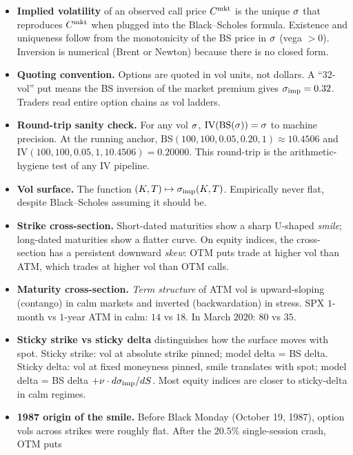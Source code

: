 \begin{itemize}
  \item \textbf{Implied volatility} of an observed call price
  $C^{\text{mkt}}$ is the unique $\sigma$ that reproduces
  $C^{\text{mkt}}$ when plugged into the Black--Scholes
  formula. Existence and uniqueness follow from the monotonicity
  of the BS price in $\sigma$ (vega $> 0$). Inversion is numerical
  (Brent or Newton) because there is no closed form.
  \item \textbf{Quoting convention.} Options are quoted in vol
  units, not dollars. A ``$32$-vol'' put means the BS
  inversion of the market premium gives $\sigma_{\text{imp}} =
  0.32$. Traders read entire option chains as vol ladders.
  \item \textbf{Round-trip sanity check.} For any vol $\sigma$,
  $\text{IV}(\text{BS}(\sigma)) = \sigma$ to machine precision.
  At the running anchor, $\text{BS}(100, 100, 0.05, 0.20, 1)
  \approx 10.4506$ and $\text{IV}(100, 100, 0.05, 1, 10.4506) =
  0.20000$. This round-trip is the arithmetic-hygiene test of any
  IV pipeline.
  \item \textbf{Vol surface.} The function $(K, T)
  \mapsto \sigma_{\text{imp}}(K, T)$. Empirically
  never flat, despite Black--Scholes assuming it should be.
  \item \textbf{Strike cross-section.} Short-dated maturities
  show a sharp U-shaped \emph{smile}; long-dated maturities show
  a flatter curve. On equity indices, the cross-section has a
  persistent downward \emph{skew}: OTM puts trade at higher vol
  than ATM, which trades at higher vol than OTM calls.
  \item \textbf{Maturity cross-section.} \emph{Term structure} of
  ATM vol is upward-sloping (contango) in calm markets and
  inverted (backwardation) in stress. SPX $1$-month vs $1$-year
  ATM in calm: $14$ vs $18$. In March $2020$: $80$ vs $35$.
  \item \textbf{Sticky strike vs sticky delta} distinguishes how
  the surface moves with spot. Sticky strike: vol at absolute
  strike pinned; model delta = BS delta. Sticky delta: vol at
  fixed moneyness pinned, smile translates with spot; model
  delta = BS delta $+ \nu \cdot d\sigma_{\text{imp}}/dS$.
  Most equity indices are closer to sticky-delta in calm
  regimes.
  \item \textbf{1987 origin of the smile.} Before Black Monday
  (October 19, 1987), option vols across strikes were roughly
  flat. After the $20.5\%$ single-session crash, OTM puts

\end{itemize}
